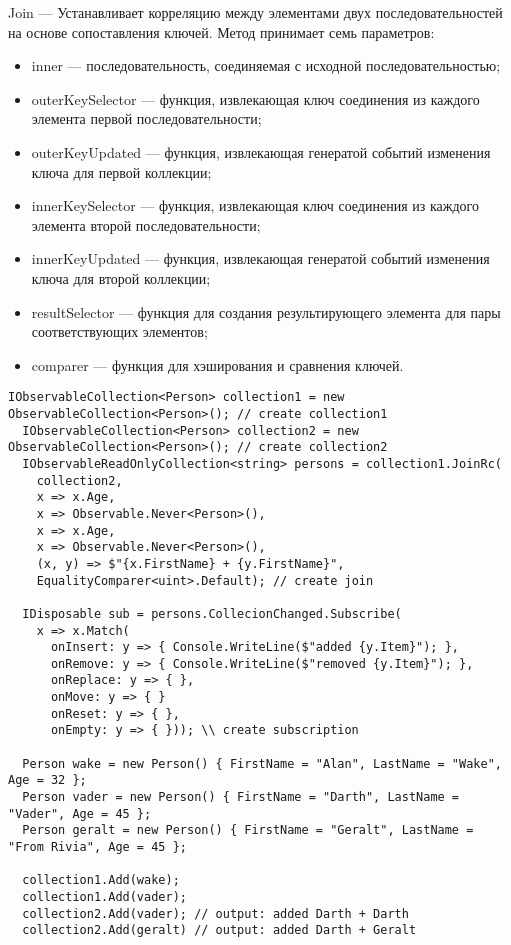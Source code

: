 Join --- Устанавливает корреляцию между элементами двух последовательностей на основе сопоставления ключей.
Метод принимает семь параметров:

\begin{itemize}
  \item inner --- последовательность, соединяемая с исходной последовательностью;
  \item outerKeySelector --- функция, извлекающая ключ соединения из каждого элемента первой последовательности;
  \item outerKeyUpdated --- функция, извлекающая генератой событий изменения ключа для первой коллекции;
  \item innerKeySelector --- функция, извлекающая ключ соединения из каждого элемента второй последовательности;
  \item innerKeyUpdated --- функция, извлекающая генератой событий изменения ключа для второй коллекции;
  \item resultSelector --- функция для создания результирующего элемента для пары соответствующих элементов;
  \item comparer --- функция для хэширования и сравнения ключей.
\end{itemize}

\begin{lstlisting}[style=csharpinlinestyle, caption={Пример использования Join}, label=lst:practice:development:join]
  IObservableCollection<Person> collection1 = new ObservableCollection<Person>(); // create collection1
  IObservableCollection<Person> collection2 = new ObservableCollection<Person>(); // create collection2
  IObservableReadOnlyCollection<string> persons = collection1.JoinRc(
    collection2,
    x => x.Age,
    x => Observable.Never<Person>(),
    x => x.Age,
    x => Observable.Never<Person>(),
    (x, y) => $"{x.FirstName} + {y.FirstName}",
    EqualityComparer<uint>.Default); // create join

  IDisposable sub = persons.CollecionChanged.Subscribe(
    x => x.Match(
      onInsert: y => { Console.WriteLine($"added {y.Item}"); },
      onRemove: y => { Console.WriteLine($"removed {y.Item}"); },
      onReplace: y => { },
      onMove: y => { }
      onReset: y => { },
      onEmpty: y => { })); \\ create subscription

  Person wake = new Person() { FirstName = "Alan", LastName = "Wake", Age = 32 };
  Person vader = new Person() { FirstName = "Darth", LastName = "Vader", Age = 45 };
  Person geralt = new Person() { FirstName = "Geralt", LastName = "From Rivia", Age = 45 };

  collection1.Add(wake);
  collection1.Add(vader);
  collection2.Add(vader); // output: added Darth + Darth
  collection2.Add(geralt) // output: added Darth + Geralt
\end{lstlisting}

